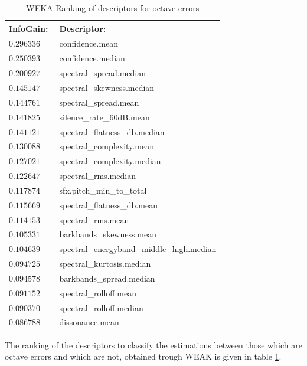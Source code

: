 \documentclass{proc}
\begin{document}
\begin{table}[h]
    \begin{center}
        \begin{tabular}{ | l | l |}
            \hline
            InfoGain:   &   Descriptor: \\  \hline
            \hline
            $0.296336$  &    confidence.mean   \\ \hline
            $0.250393$  &    confidence.median   \\ \hline
            $0.200927$  &    spectral\_spread.median   \\ \hline
            $0.145147$  &    spectral\_skewness.median   \\ \hline
            $0.144761$  &    spectral\_spread.mean   \\ \hline
            $0.141825$  &    silence\_rate\_60dB.mean   \\ \hline
            $0.141121$  &    spectral\_flatness\_db.median   \\ \hline
            $0.130088$  &    spectral\_complexity.mean   \\ \hline
            $0.127021$  &    spectral\_complexity.median   \\ \hline
            $0.122647$  &    spectral\_rms.median   \\ \hline
            $0.117874$  &   sfx.pitch\_min\_to\_total   \\ \hline
            $0.115669$  &    spectral\_flatness\_db.mean   \\ \hline
            $0.114153$  &    spectral\_rms.mean   \\ \hline
            $0.105331$  &    barkbands\_skewness.mean   \\ \hline
            $0.104639$  &    spectral\_energyband\_middle\_high.median   \\ \hline
            $0.094725$  &    spectral\_kurtosis.median   \\ \hline
            $0.094578$  &    barkbands\_spread.median   \\ \hline
            $0.091152$  &    spectral\_rolloff.mean   \\ \hline
            $0.090370$  &    spectral\_rolloff.median   \\ \hline
            $0.086788$  &    dissonance.mean   \\ \hline

       \end{tabular}
        \caption{WEKA Ranking of descriptors for octave errors}
        \label{table:wekaOct_desc}
    \end{center}
\end{table}
The ranking of the descriptors to classify the estimations between those which are octave errors and which are not, obtained trough WEAK is given in table \ref{table:wekaOct_desc}.
\end{document}
